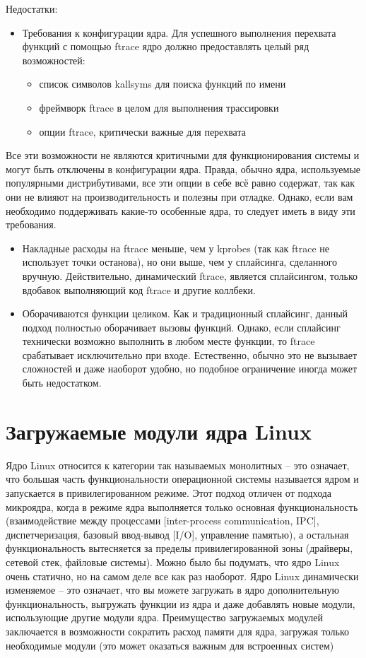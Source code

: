 Недостатки:
\begin{itemize}
	\item Требования к конфигурации ядра. Для успешного выполнения перехвата функций с помощью ftrace ядро должно предоставлять целый ряд возможностей:
	\begin{itemize}
		\item список символов kallsyms для поиска функций по имени
		\item фреймворк ftrace в целом для выполнения трассировки
		\item опции ftrace, критически важные для перехвата
	\end{itemize}
\end{itemize}

Все эти возможности не являются критичными для функционирования системы и могут быть отключены в конфигурации ядра. Правда, обычно ядра, используемые популярными дистрибутивами, все эти опции в себе всё равно содержат, так как они не влияют на производительность и полезны при отладке. Однако, если вам необходимо поддерживать какие-то особенные ядра, то следует иметь в виду эти требования.

\begin{itemize}
	\item Накладные расходы на ftrace меньше, чем у kprobes (так как ftrace не использует точки останова), но они выше, чем у сплайсинга, сделанного вручную. Действительно, динамический ftrace, является сплайсингом, только вдобавок выполняющий код ftrace и другие коллбеки.
	\item Оборачиваются функции целиком. Как и традиционный сплайсинг, данный подход полностью оборачивает вызовы функций. Однако, если сплайсинг технически возможно выполнить в любом месте функции, то ftrace срабатывает исключительно при входе. Естественно, обычно это не вызывает сложностей и даже наоборот удобно, но подобное ограничение иногда может быть недостатком.
\end{itemize}

\section{Загружаемые модули ядра Linux }
Ядро Linux относится к категории так называемых монолитных – это означает, что большая часть функциональности операционной системы называется ядром и запускается в привилегированном режиме. Этот подход отличен от подхода микроядра, когда в режиме ядра выполняется только основная функциональность (взаимодействие между процессами [inter-process communication, IPC], диспетчеризация, базовый ввод-вывод [I/O], управление памятью), а остальная функциональность вытесняется за пределы привилегированной зоны (драйверы, сетевой стек, файловые системы). Можно было бы подумать, что ядро Linux очень статично, но на самом деле все как раз наоборот.
Ядро Linux динамически изменяемое – это означает, что вы можете загружать в ядро дополнительную функциональность, выгружать функции из ядра и даже добавлять новые модули, использующие другие модули ядра. Преимущество загружаемых модулей заключается в возможности сократить расход памяти для ядра, загружая только необходимые модули (это может оказаться важным для встроенных систем) \cite{book4}

